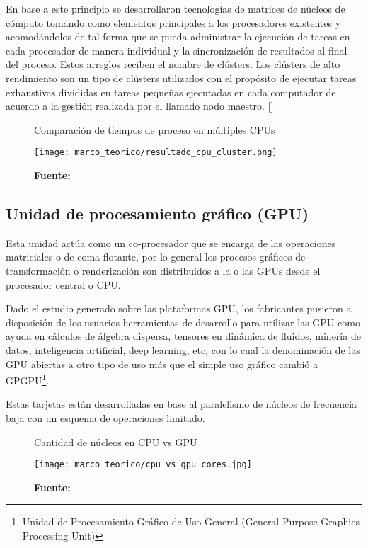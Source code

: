 \documentclass[../main/main.tex]{subfiles}
\begin{document}
  En base a este principio se desarrollaron tecnologías de matrices de núcleos de cómputo tomando como elementos principales a los procesadores existentes y acomodándolos de tal forma que se pueda administrar la ejecución de tareas en cada procesador de manera individual y la sincronización de resultados al final del proceso. Estos arreglos reciben el nombre de clústers. Los clústers de alto rendimiento son un tipo de clústers utilizados con el propósito de ejecutar tareas exhaustivas divididas en tareas pequeñas ejecutadas en cada computador de acuerdo a la gestión realizada por el llamado nodo maestro. [\cite{article:cluster_alto_rendimiento}]

  \begin{figure}[H]
    \centering
    \caption{Comparación de tiempos de proceso en múltiples CPUs}
    \texttt{[image: marco\_teorico/resultado\_cpu\_cluster.png]}
    \caption*{\textbf{Fuente:} \cite[p.~7]{article:cluster_alto_rendimiento}}
  \end{figure}

  \subsection{Unidad de procesamiento gráfico (GPU)}

  Esta unidad actúa como un co-procesador que se encarga de las operaciones matriciales o de coma flotante, por lo general los procesos gráficos de transformación o renderización son distribuidos a la o las GPUs desde el procesador central o CPU.

  Dado el estudio generado sobre las plataformas GPU, los fabricantes pusieron a disposición de los usuarios herramientas de desarrollo para utilizar las GPU como ayuda en cálculos de álgebra dispersa, tensores en dinámica de fluidos, minería de datos, inteligencia artificial, deep learning, etc, con lo cual la denominación de las GPU abiertas a otro tipo de uso más que el simple uso gráfico cambió a GPGPU\footnote{Unidad de Procesamiento Gráfico de Uso General (General Purpose Graphics Processing Unit)}.

  Estas tarjetas están desarrolladas en base al paralelismo de núcleos de frecuencia baja con un esquema de operaciones limitado.

  \begin{figure}[H]
    \centering
    \caption{Cantidad de núcleos en CPU vs GPU}
    \texttt{[image: marco\_teorico/cpu\_vs\_gpu\_cores.jpg]}
    \caption*{\textbf{Fuente:} \cite{web:gpgpu}}
  \end{figure}
\end{document}
